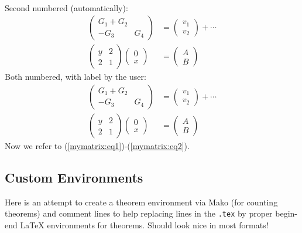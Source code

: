 \documentclass[%
oneside,                 %
final,                   %
10pt]{article}
\theoremstyle{definition}
\begin{document}
\begin{enumerate}
\begin{align}
\nonumber
\end{align}
Second numbered (automatically):
\begin{align}
\begin{pmatrix}
G_1 + G_2\\ 
-G_3 & G_4
\end{pmatrix}
&=
\begin{pmatrix}
 v_1 \\ 
 v_2
\end{pmatrix}
+ \cdots\nonumber
\\ 
\left(\begin{array}{ll}
y & 2\\ 
2 & 1
\end{array}\right)
\left(\begin{array}{ll}
0 \\ x
\end{array}\right)
&= \begin{pmatrix}
A \\ B
\end{pmatrix}
\end{align}
Both numbered, with label by the user:
\begin{align}
\begin{pmatrix}
G_1 + G_2\\ 
-G_3 & G_4
\end{pmatrix}
&=
\begin{pmatrix}
 v_1 \\ 
 v_2
\end{pmatrix}
+ \cdots \label{mymatrix:eq1}
\\ 
\label{mymatrix:eq2}
\left(\begin{array}{ll}
y & 2\\ 
2 & 1
\end{array}\right)
\left(\begin{array}{ll}
0 \\ x
\end{array}\right)
&= \begin{pmatrix}
A \\ B
\end{pmatrix}
\end{align}
Now we refer to (\ref{mymatrix:eq1})-(\ref{mymatrix:eq2}).
\subsection{Custom Environments}
Here is an attempt to create a theorem environment via Mako
(for counting theorems) and comment lines to help replacing lines in
the \texttt{.tex} by proper begin-end {\LaTeX} environments for theorems.
Should look nice in most formats!
\label{theorem:fundamental1}

\end{enumerate}
\end{document}
